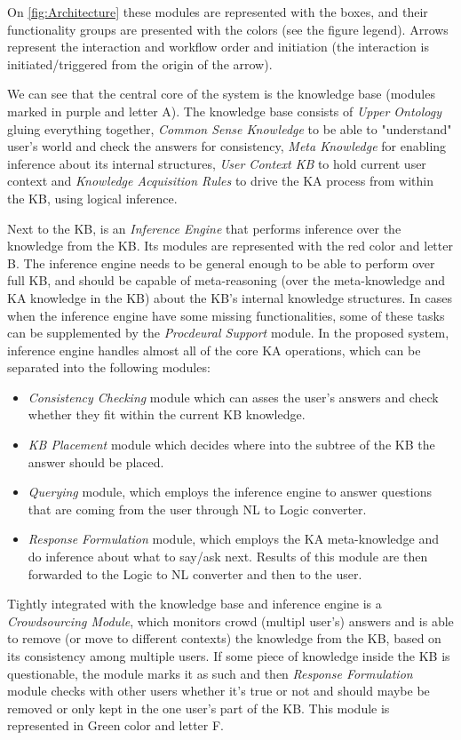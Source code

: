 On \autoref{fig:Architecture} these modules are represented with the boxes,
and their functionality groups are presented with the colors (see the figure
legend). Arrows represent the interaction and workflow order and initiation 
(the interaction is initiated/triggered from the origin of the arrow).

We can see that the central core of the
system is the knowledge base (modules marked in purple and letter A). The 
knowledge base consists of \emph{Upper Ontology} gluing everything together, 
\emph{Common Sense Knowledge} to be able to "understand" user's world and check
the answers for consistency, \emph{Meta Knowledge} for enabling inference about 
its internal structures, \emph{User Context KB} to hold current user context and 
\emph{Knowledge Acquisition Rules} to drive the KA process from within the KB, 
using logical inference. 

Next to the KB, is an \emph{Inference Engine} that performs inference over 
the knowledge from the KB. Its modules are represented with the red color 
and letter B. The inference engine needs to be general enough to be able to
perform over full KB, and should be capable of meta-reasoning (over the 
meta-knowledge and KA knowledge in the KB) about the KB's internal knowledge
structures. In cases when the inference engine have some missing functionalities,
some of these tasks can be supplemented by the \emph{Procdeural Support} 
module. In the proposed system, inference engine handles almost all of the 
core KA operations, which can be separated into the following modules:
\begin{itemize}
   \item \emph{Consistency Checking} module which can asses the user's answers
   and check whether they fit within the current KB knowledge.
   \item \emph{KB Placement} module which decides where into the subtree of the
   KB the answer should be placed.
   \item \emph{Querying} module, which employs the inference engine to answer
   questions that are coming from the user through NL to Logic converter.
   \item \emph{Response Formulation} module, which employs the KA meta-knowledge
   and do inference about what to say/ask next. Results of this module are then
   forwarded to the Logic to NL converter and then to the user.

\end{itemize}

Tightly integrated with the knowledge base and inference engine is a 
\emph{Crowdsourcing Module}, which monitors crowd (multipl user's) answers and 
is able to remove (or move to different contexts) the knowledge from the KB, 
based on its consistency among multiple users. If some piece of knowledge inside
the KB is questionable, the module marks it as such and then \emph{Response
Formulation} module checks with other users whether it's true or not and should
maybe be removed or only kept in the one user's part of the KB. This module is 
represented in Green color and letter F.

